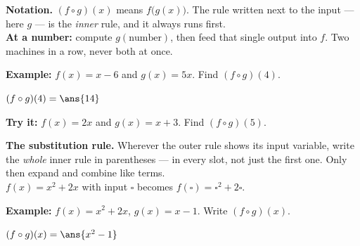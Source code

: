 \documentclass[12pt]{article}
\begin{document}


\begin{formulabox}
\textbf{Notation.} $(f \circ g)(x)$ means $f\big(g(x)\big)$. The rule written
next to the input --- here $g$ --- is the \emph{inner} rule, and it always runs
first.\\[3pt]
\textbf{At a number:} compute $g(\text{number})$, then feed that single output
into $f$. Two machines in a row, never both at once.
\end{formulabox}

\begin{examplebox}
\textbf{Example:} \quad $f(x) = x - 6$ and $g(x) = 5x$. Find $(f \circ g)(4)$.

$(f \circ g)(4) = \ans{14}$
\end{examplebox}

\begin{tryitbox}
\textbf{Try it:} \quad $f(x) = 2x$ and $g(x) = x + 3$. Find $(f \circ g)(5)$.\\[2pt]
\end{tryitbox}


\begin{formulabox}
\textbf{The substitution rule.} Wherever the outer rule shows its input
variable, write the \emph{whole} inner rule in parentheses --- in every slot,
not just the first one. Only then expand and combine like terms.\\[3pt]
$f(x) = x^2 + 2x$ with input $\square$ becomes $f(\square) = \square^2 + 2\square$.
\end{formulabox}

\begin{examplebox}
\textbf{Example:} \quad $f(x) = x^2 + 2x$, $g(x) = x - 1$. Write $(f \circ g)(x)$.

$(f \circ g)(x) = \ans{x^2 - 1}$
\end{examplebox}
\end{document}
